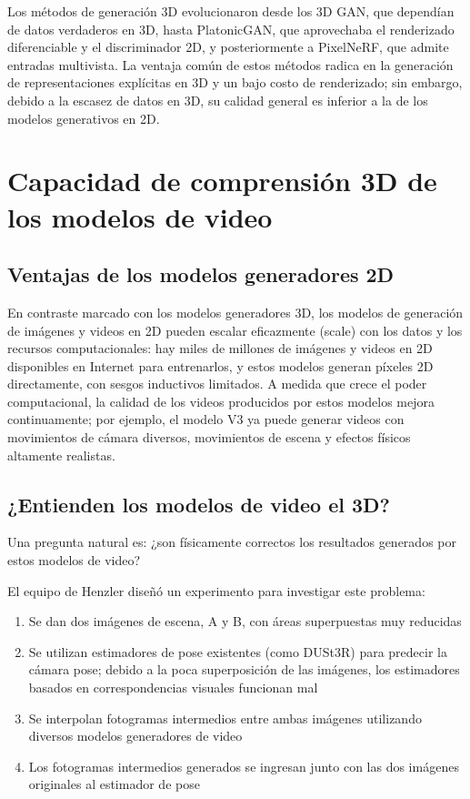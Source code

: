 \documentclass[a4paper]{article}
\begin{document}
Los métodos de generación 3D evolucionaron desde los 3D GAN, que dependían de datos verdaderos en 3D, hasta PlatonicGAN, que aprovechaba el renderizado diferenciable y el discriminador 2D, y posteriormente a PixelNeRF, que admite entradas multivista. La ventaja común de estos métodos radica en la generación de representaciones explícitas en 3D y un bajo costo de renderizado; sin embargo, debido a la escasez de datos en 3D, su calidad general es inferior a la de los modelos generativos en 2D.
\section{Capacidad de comprensión 3D de los modelos de video}

\subsection{Ventajas de los modelos generadores 2D}

En contraste marcado con los modelos generadores 3D, los modelos de generación de imágenes y videos en 2D pueden escalar eficazmente (scale) con los datos y los recursos computacionales: hay miles de millones de imágenes y videos en 2D disponibles en Internet para entrenarlos, y estos modelos generan píxeles 2D directamente, con sesgos inductivos limitados. A medida que crece el poder computacional, la calidad de los videos producidos por estos modelos mejora continuamente; por ejemplo, el modelo V3 ya puede generar videos con movimientos de cámara diversos, movimientos de escena y efectos físicos altamente realistas.

\subsection{¿Entienden los modelos de video el 3D?}

Una pregunta natural es: ¿son físicamente correctos los resultados generados por estos modelos de video?

El equipo de Henzler diseñó un experimento para investigar este problema:

\begin{enumerate}
    \item Se dan dos imágenes de escena, A y B, con áreas superpuestas muy reducidas
    \item Se utilizan estimadores de pose existentes (como DUSt3R) para predecir la cámara pose; debido a la poca superposición de las imágenes, los estimadores basados en correspondencias visuales funcionan mal
    \item Se interpolan fotogramas intermedios entre ambas imágenes utilizando diversos modelos generadores de video
    \item Los fotogramas intermedios generados se ingresan junto con las dos imágenes originales al estimador de pose
\end{enumerate}
\end{document}
